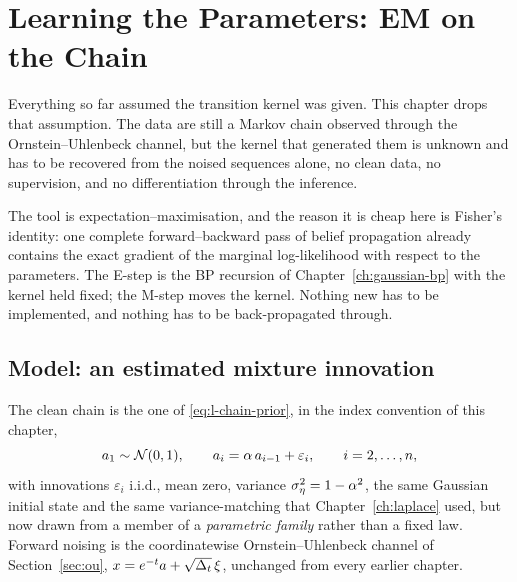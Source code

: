 \chapter{Learning the Parameters: EM on the Chain}\label{ch:em-method}

Everything so far assumed the transition kernel was given. This chapter drops
that assumption. The data are still a Markov chain observed through the
Ornstein--Uhlenbeck channel, but the kernel that generated them is unknown and
has to be recovered from the noised sequences alone, no clean data, no
supervision, and no differentiation through the inference.

The tool is expectation--maximisation, and the reason it is cheap here is
Fisher's identity: one complete forward--backward pass of belief propagation
already contains the exact gradient of the marginal log-likelihood with respect
to the parameters. The E-step is the BP recursion of
Chapter~\ref{ch:gaussian-bp} with the kernel held fixed; the M-step moves the
kernel. Nothing new has to be implemented, and nothing has to be
back-propagated through.
\section{Model: an estimated mixture innovation}\label{sec:em-model}

The clean chain is the one of \eqref{eq:l-chain-prior}, in the index
convention of this chapter,
\begin{equation}
  a_1 \sim \mathcal{N}(0,1), \qquad a_i = \alpha\, a_{i-1} + \varepsilon_i,
  \qquad i = 2,\dots,n,
  \label{eq:em-chain}
\end{equation}
with innovations $\varepsilon_i$ i.i.d., mean zero, variance
$\sigma_\eta^2 = 1-\alpha^2$, the same Gaussian initial state and the same
variance-matching that Chapter~\ref{ch:laplace} used, but now drawn from
a member of a \emph{parametric family} rather than a fixed law. Forward noising is the coordinatewise
Ornstein--Uhlenbeck channel of Section~\ref{sec:ou},
$x = e^{-t} a + \sqrt{\Delta_t}\,\xi$, unchanged from every earlier chapter.

